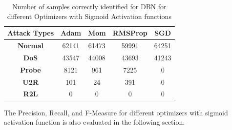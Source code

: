 \documentclass[12pt, a4paper]{report}
\begin{document}
\begin{table}[ht]
\centering
\captionsetup{justification=centering,margin=2cm}
\begin{tabular}{|c|c|c|c|c|}
\hline
\textbf{Attack Types} & \textbf{Adam} & \textbf{Mom} & \textbf{RMSProp} & \textbf{SGD} \\ \hline
\textbf{Normal}       & 62141         & 61473        & 59991            & 64251        \\ \hline
\textbf{DoS}          & 43547         & 44008        & 43693            & 41243        \\ \hline
\textbf{Probe}        & 8121          & 961          & 7225             & 0            \\ \hline
\textbf{U2R}          & 101           & 24           & 391              & 0            \\ \hline
\textbf{R2L}          & 0             & 0            & 0                & 0            \\ \hline
\end{tabular}
\caption{Number of samples correctly identified for DBN for different Optimizers with Sigmoid Activation functions}
\label{DBN_predicted_attacks}
\end{table}

The Precision, Recall, and F-Measure for different optimizers with sigmoid activation function is also evaluated in the following section.
\end{document}
